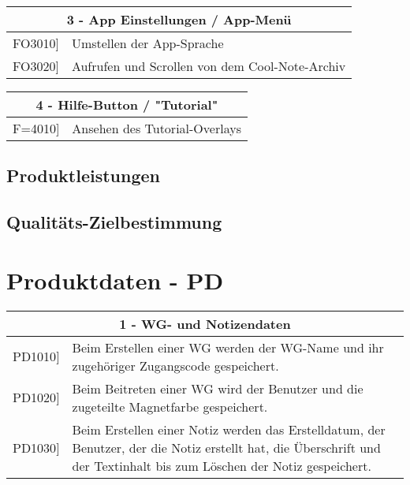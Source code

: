 \documentclass[a4paper]{scrreprt}
\begin{document}
    		\begin{table}[h!]
    			\centering
    			\label{my-label}
    			\begin{tabular}{p{2cm}p{12cm}}
    				
    				\multicolumn{2}{c}{\textbf{3 - App Einstellungen / App-Menü}} \\ \hline
    				\centering{[}FO3010{]} & Umstellen der App-Sprache\\
    				\centering{[}FO3020{]} & Aufrufen und Scrollen von dem Cool-Note-Archiv\\
    				\hline
    			\end{tabular}
    		\end{table}
    		
    		\vspace{5mm}
    		
    		\begin{table}[h!]
    			\centering
    			\label{my-label}
    			\begin{tabular}{p{2cm}p{12cm}}
    				
    				\multicolumn{2}{c}{\textbf{4 - Hilfe-Button / "Tutorial"}} \\ \hline
    				\centering{[}F=4010{]} & Ansehen des Tutorial-Overlays\\    				
    				\hline
    			\end{tabular}
    		\end{table}
    		
    		\vspace{1cm}
    		
    		\section{Produktleistungen}
    		
    		\section{Qualitäts-Zielbestimmung}

    \chapter{Produktdaten - PD}
    	\begin{table}[h!]
    		\centering
    		\label{my-label}
    		\begin{tabular}{p{2cm}p{12cm}}
    			
    			\multicolumn{2}{c}{\textbf{1 - WG- und Notizendaten}} \\ \hline
    			\centering{[}PD1010{]} & Beim Erstellen einer WG werden der WG-Name und ihr zugehöriger Zugangscode gespeichert.\\
    			\centering{[}PD1020{]}& Beim Beitreten einer WG wird der Benutzer und die zugeteilte Magnetfarbe gespeichert.                                 \\
    			\centering{[}PD1030{]}& Beim Erstellen einer Notiz werden das Erstelldatum, der Benutzer, der die Notiz erstellt hat, die Überschrift und der Textinhalt bis zum Löschen der Notiz gespeichert.\\ 
    			\hline
    		\end{tabular}
    	\end{table}
    
\end{document}
